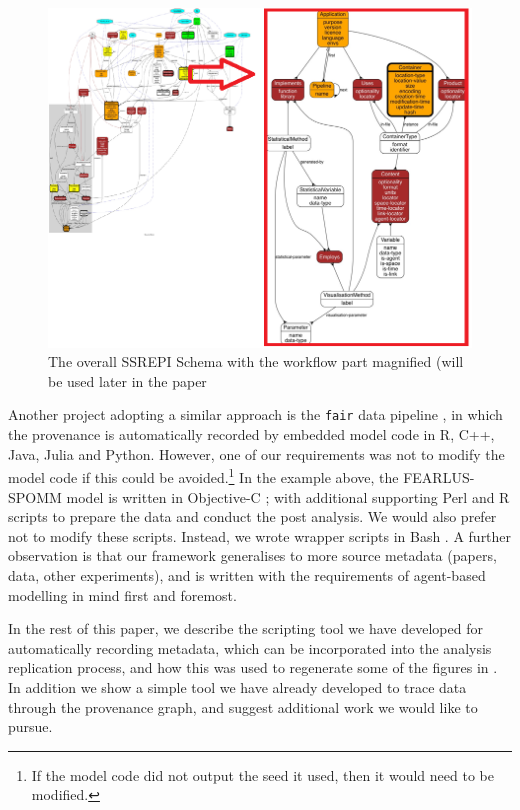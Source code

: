 \documentclass[runningheads]{llncs}
\begin{document}
\begin{figure} %
    \includegraphics[width=\textwidth]{img/schema.png} %
    \caption{The overall SSREPI Schema with the workflow part magnified (will be used later in the paper}
    \label{fig:schema} 
\end{figure}

Another project adopting a similar approach is the \texttt{fair} data pipeline \cite{mitchell2022fair}, in which the provenance is automatically
recorded by embedded model code in R, C++, Java, Julia and Python. However, one of our requirements
was not to modify the model code if this could be avoided.\footnote{If the model code did not output the seed it used, then it would need to be modified.} In the example above, the FEARLUS-SPOMM model is written
in Objective-C \cite{objectivec}; with additional supporting Perl and R scripts to prepare the data and conduct the
post analysis. We would also prefer not to modify these scripts. Instead, we wrote wrapper scripts in Bash
\cite{bash4420}. A further observation is that our framework
generalises to more source metadata (papers, data, other experiments), and
is written with the requirements of agent-based modelling in mind first and foremost.

In the rest of this paper, we describe the scripting tool we have developed  for
automatically recording metadata, which can be incorporated into the analysis
replication process, and how this  was used to regenerate some of the figures
in \cite{polhill_nonlinearities_2013}. In addition we show a simple tool we have already developed to trace data through the provenance graph, and suggest additional work we would like to pursue.
\end{document}
